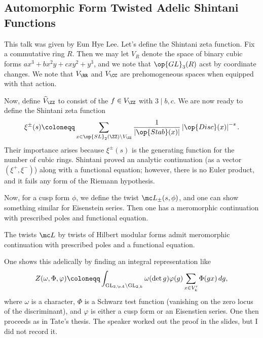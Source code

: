 \documentclass{article}
\begin{document}
\subsection{Automorphic Form Twisted Adelic Shintani Functions}
This talk was given by Eun Hye Lee. Let's define the Shintani zeta function. Fix a commutative ring $R$. Then we may let $V_R$ denote the space of binary cubic forms $ax^3+bx^2y+cxy^2+y^3$, and we note that $\op{GL}_3(R)$ acst by coordinate changes. We note that $V_\RR$ and $V_\CC$ are prehomogeneous spaces when equipped with that action.

Now, define $\widehat V_\ZZ$ to consist of the $f\in V_\ZZ$ with $3\mid b,c$. We are now ready to define the Shintani zeta function
\[\xi^{\pm}(s)\coloneqq\sum_{x\in\op{SL}_2(\ZZ)\backslash V_\ZZ}\frac1{\left|\op{Stab}(x)\right|}\left|\op{Disc}(x)\right|^{-s}.\]
Their importance arises because $\xi^{\pm}(s)$ is the generating function for the number of cubic rings. Shintani proved an analytic continuation (as a vector $(\xi^+,\xi^-)$) along with a functional equation; however, there is no Euler product, and it fails any form of the Riemann hypothesis.

Now, for a cusp form $\phi$, we define the twist $\mc L_\pm(s,\phi)$, and one can show something similar for Eisenstein series. Then one has a meromorphic continuation with prescribed poles and functional equation.
\begin{theorem}
	The twists $\mc L$ by twists of Hilbert modular forms admit meromorphic continuation with prescribed poles and a functional equation.
\end{theorem}
One shows this adelically by finding an integral representation like
\[Z(\omega,\Phi,\varphi)\coloneqq\int_{\mathrm{GL}_{2,\AA}\backslash\mathrm{GL}_{2,k}}\omega(\det g)\varphi(g)\sum_{x\in V_k'}\Phi(gx)\,dg,\]
where $\omega$ is a character, $\Phi$ is a Schwarz test function (vanishing on the zero locus of the discriminant), and $\varphi$ is either a cusp form or an Eisenstien series. One then proceeds as in Tate's thesis. The speaker worked out the proof in the slides, but I did not record it.
\end{document}

